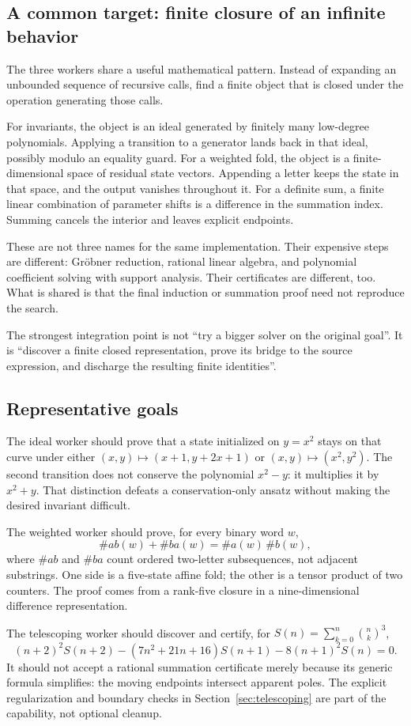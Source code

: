 \subsection{A common target: finite closure of an infinite behavior}

The three workers share a useful mathematical pattern. Instead of expanding
an unbounded sequence of recursive calls, find a finite object that is closed
under the operation generating those calls.

For invariants, the object is an ideal generated by finitely many low-degree
polynomials. Applying a transition to a generator lands back in that ideal,
possibly modulo an equality guard. For a weighted fold, the object is a
finite-dimensional space of residual state vectors. Appending a letter keeps
the state in that space, and the output vanishes throughout it. For a definite
sum, a finite linear combination of parameter shifts is a difference in the
summation index. Summing cancels the interior and leaves explicit endpoints.

These are not three names for the same implementation. Their expensive steps
are different: Gr\"obner reduction, rational linear algebra, and polynomial
coefficient solving with support analysis. Their certificates are different,
too. What is shared is that the final induction or summation proof need not
reproduce the search.

\begin{finding}
The strongest integration point is not ``try a bigger solver on the original
goal''. It is ``discover a finite closed representation, prove its bridge to the
source expression, and discharge the resulting finite identities''.
\end{finding}

\subsection{Representative goals}

The ideal worker should prove that a state initialized on $y=x^2$ stays on that
curve under either $(x,y)\mapsto(x+1,y+2x+1)$ or
$(x,y)\mapsto(x^2,y^2)$. The second transition does not conserve the polynomial
$x^2-y$: it multiplies it by $x^2+y$. That distinction defeats a conservation-only
ansatz without making the desired invariant difficult.

The weighted worker should prove, for every binary word $w$,
\[
 \#ab(w)+\#ba(w)=\#a(w)\,\#b(w),
\]
where $\#ab$ and $\#ba$ count ordered two-letter subsequences, not adjacent
substrings. One side is a five-state affine fold; the other is a tensor product
of two counters. The proof comes from a rank-five closure in a nine-dimensional
difference representation.

The telescoping worker should discover and certify, for
$S(n)=\sum_{k=0}^{n}\binom nk^3$,
\[
 (n+2)^2S(n+2)-(7n^2+21n+16)S(n+1)-8(n+1)^2S(n)=0.
\]
It should not accept a rational summation certificate merely because its generic
formula simplifies: the moving endpoints intersect apparent poles. The explicit
regularization and boundary checks in Section~\ref{sec:telescoping} are part of
the capability, not optional cleanup.
